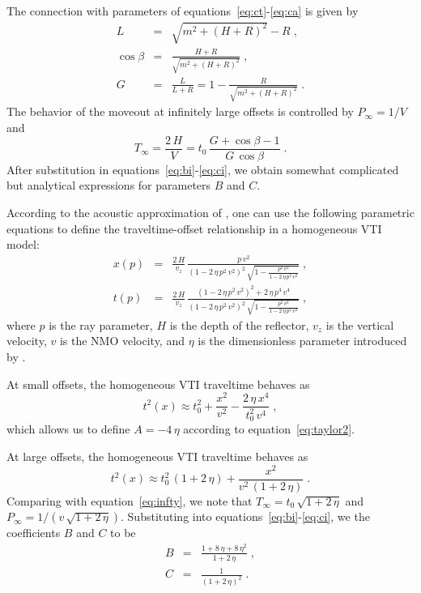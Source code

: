 The connection with parameters of equations~\ref{eq:ct}-\ref{eq:ca} is given by
\begin{eqnarray}
\label{eq:l}
L & = & \sqrt{m^2 + (H+R)^2} - R\;,   \\
\label{eq:cbeta}
\cos{\beta} & = & \frac{H+R}{\sqrt{m^2 + (H+R)^2}}\;, \\
\label{eq:g}
G & = & \frac{L}{L+R} = 1 - \frac{R}{\sqrt{m^2 + (H+R)^2}}\;.
\end{eqnarray}
The behavior of the moveout at infinitely large offsets is controlled by $P_{\infty} = 1/V$ and
\begin{equation}
\label{eq:ctinf3}
T_{\infty} = \frac{2\,H}{V} = t_0\,\frac{G+\cos{\beta} - 1}{G\,\cos{\beta}}\;. 
\end{equation}
After substitution in equations~\ref{eq:bi}-\ref{eq:ci}, we obtain
somewhat complicated but analytical expressions for parameters $B$ and
$C$.


According to the acoustic approximation of
\cite{GEO63-02-06230631}, one can use the following parametric
equations to define the traveltime-offset relationship in a
homogeneous VTI model:
\begin{eqnarray}
\label{eq:xpvti}
x(p) & = & \frac{2\,H}{v_z}\,\frac{p\,v^2}{(1-2\,\eta\,p^2\,v^2)^2\,\sqrt{1-\frac{p^2\,v^2}{1-2\,\eta\,p^2\,v^2}}}\;, \\
\label{eq:tpvti}
t(p) & = & \frac{2\,H}{v_z}\,\frac{(1-2\,\eta\,p^2\,v^2)^2 + 2\,\eta\,p^4\,v^4}
{(1-2\,\eta\,p^2\,v^2)^2\,\sqrt{1-\frac{p^2\,v^2}{1-2\,\eta\,p^2\,v^2}}}\;,
\end{eqnarray}
where $p$ is the ray parameter, $H$ is the depth of the reflector,
$v_z$ is the vertical velocity, $v$ is the NMO velocity, and $\eta$ is
the dimensionless parameter introduced by \cite{GEO60-05-15501566}.

At small offsets, the homogeneous VTI traveltime behaves as
\begin{equation}
\label{eq:vtismall}
t^2(x) \approx t_0^2 + \frac{x^2}{v^2} - \frac{2\,\eta\,x^4}{t_0^2\,v^4}\;,
\end{equation} 
which allows us to define $A=-4\,\eta$ according to equation~\ref{eq:taylor2}.

At large offsets, the homogeneous VTI traveltime behaves as
\begin{equation}
\label{eq:vtilarge}
t^2(x) \approx t_0^2\,(1+2\,\eta) + \frac{x^2}{v^2\,(1+2\,\eta)}\;.
\end{equation} 
Comparing with equation~\ref{eq:infty}, we note that $T_{\infty} =
t_0\,\sqrt{1+2\,\eta}$ and $P_{\infty} =
1/(v\,\sqrt{1+2\,\eta})$. Substituting into
equations~\ref{eq:bi}-\ref{eq:ci}, we   the
coefficients $B$ and $C$ to be
\begin{eqnarray}
\label{eq:bvti}
B & = & \frac{1 + 8\,\eta + 8\,\eta^2}{1 + 2\,\eta}\;, \\
\label{eq:cvti}
C & = & \frac{1}{(1 + 2\,\eta)^2}\;.
\end{eqnarray}

\nocite{Sword.sep.51.313}




